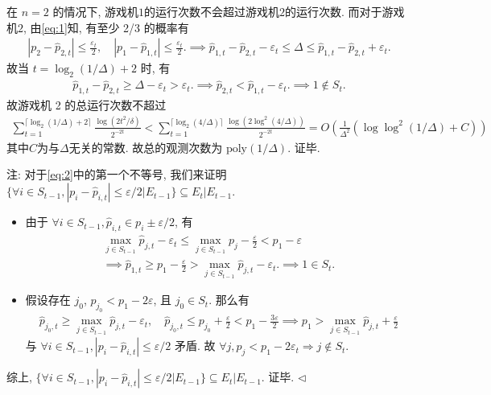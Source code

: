 \documentclass[11pt]{article}
\newenvironment{answer}[1][Solution]{\begin{trivlist}
    \item[\hskip \labelsep {\bfseries #1.}\hskip \labelsep]}{\hfill$\lhd$\end{trivlist}}
\newcommand\1{\mathds{1}}
\begin{document}
\begin{answer}
\begin{enumerate}[label=(\arabic*)]
        在 $n=2$ 的情况下, 游戏机$1$的运行次数不会超过游戏机$2$的运行次数. 而对于游戏机$2$, 由\eqref{eq:1}知, 有至少 2/3 的概率有
        \begin{align*}
            |p_2 - \hat{p}_{2,t}| \le \frac{\varepsilon_t}{2}, \quad |p_1 - \hat{p}_{1,t}| \le \frac{\varepsilon_t}{2}. \implies \hat{p}_{1,t} - \hat{p}_{2,t} - \varepsilon_t \le \Delta \le \hat{p}_{1,t} - \hat{p}_{2,t} + \varepsilon_t.
        \end{align*}
        故当 $t = \log_2(1/\Delta) + 2$ 时, 有
        \begin{align*}
            \hat{p}_{1,t} - \hat{p}_{2,t} \ge \Delta - \varepsilon_t > \varepsilon_t. \implies \hat{p}_{2,t} < \hat{p}_{1,t} - \varepsilon_t. \implies 1 \notin S_t.
        \end{align*}
        故游戏机 2 的总运行次数不超过
        \begin{align*}
            \sum_{t=1}^{\lceil\log_2(1/\Delta) + 2\rceil} \frac{\log(2t^2 / \delta)}{2^{-2t}} < \sum_{t=1}^{\lceil\log_2(4/\Delta)\rceil} \frac{\log(2\log^2(4/\Delta))}{2^{-2t}} = O\left(\frac{1}{\Delta^2}\left(\log\log^2(1/\Delta) + C\right)\right) 
        \end{align*}
        其中$C$为与$\Delta$无关的常数. 故总的观测次数为 $\mathrm{poly}(1/\Delta)$. 证毕.
    \end{enumerate}
    注: 对于\eqref{eq:2}中的第一个不等号, 我们来证明 $\{\forall i \in S_{t-1}, |p_i - \hat{p}_{i,t}| \le \varepsilon/2 | E_{t-1}\} \subseteq E_t|E_{t-1}$.
    \begin{itemize}
        \item 由于 $\forall i \in S_{t-1}, \hat{p}_{i,t}\in p_i \pm \varepsilon/2$, 有
        \begin{gather*}
            \max_{j\in S_{t-1}} \hat{p}_{j,t} - \varepsilon_t \le \max_{j\in S_{t-1}} p_j - \frac{\varepsilon}{2} < p_1 - \varepsilon  \\
            \implies \hat{p}_{1,t} \ge p_1 - \frac{\varepsilon}{2} >  \max_{j\in S_{t-1}} \hat{p}_{j,t} - \varepsilon_t. \implies 1 \in S_t.
        \end{gather*}
        \item 假设存在 $j_0$, $p_{j_0} < p_1 - 2\varepsilon$, 且 $j_0 \in S_t$. 那么有
        \begin{gather*}
            \hat{p}_{j_0,t} \ge \max_{j\in S_{t-1}} \hat{p}_{j,t} - \varepsilon_t, \quad \hat{p}_{j_0,t} \le p_{j_0} + \frac{\varepsilon}{2} < p_1 - \frac{3\varepsilon}{2}  \implies p_1 > \max_{j\in S_{t-1}} \hat{p}_{j,t} + \frac{\varepsilon}{2}
        \end{gather*}
        与 $\forall i \in S_{t-1}, |p_i - \hat{p}_{i,t}| \le \varepsilon/2$ 矛盾. 故 $\forall j, p_j < p_1 - 2 \varepsilon_t \Rightarrow j \notin S_t$.
    \end{itemize}
    综上, $\{\forall i \in S_{t-1}, |p_i - \hat{p}_{i,t}| \le \varepsilon/2 | E_{t-1}\} \subseteq E_t|E_{t-1}$. 证毕.
\end{answer}
\end{document}
